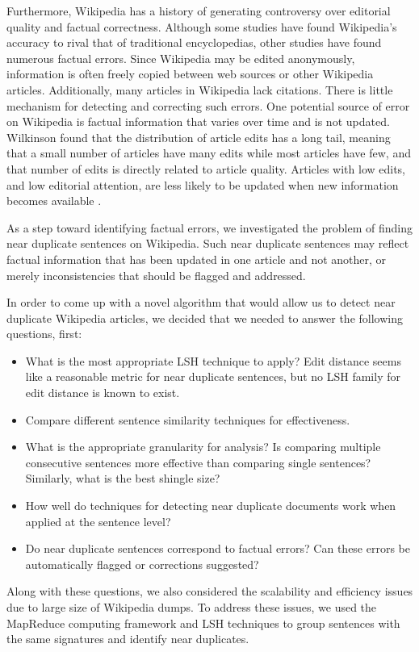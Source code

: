 \documentclass{acm_proc_article-sp}
\begin{document}
Furthermore, Wikipedia has a history of generating controversy over editorial quality and factual correctness. Although some studies have found Wikipedia’s accuracy to rival that of traditional encyclopedias, other studies have found numerous factual errors. Since Wikipedia may be edited anonymously, information is often freely copied between web sources or other Wikipedia articles. Additionally, many articles in Wikipedia lack citations. There is little mechanism for detecting and correcting such errors. One potential source of error on Wikipedia is factual information that varies over time and is not updated. Wilkinson found that the distribution of article edits has a long tail, meaning that a small number of articles have many edits while most articles have few, and that number of edits is directly related to article quality. Articles with low edits, and low editorial attention, are less likely to be updated when new information becomes available \cite{wilkinson:wiki}.

As a step toward identifying factual errors, we investigated the problem of finding near duplicate sentences on Wikipedia. Such near duplicate sentences may reflect factual information that has been updated in one article and not another, or merely inconsistencies that should be flagged and addressed. 

In order to come up with a novel algorithm that would allow us to detect near duplicate Wikipedia articles, we decided that we needed to answer the following questions, first:
\begin{itemize}
\item What is the most appropriate LSH technique to apply? Edit distance seems like a reasonable metric for near duplicate sentences, but no LSH family for edit distance is known to exist.
\item Compare different sentence similarity techniques for effectiveness. 
\item What is the appropriate granularity for analysis? Is comparing multiple consecutive sentences more effective than comparing single sentences? Similarly, what is the best shingle size?
\item How well do techniques for detecting near duplicate documents work when applied at the sentence level?
\item Do near duplicate sentences correspond to factual errors? Can these errors be automatically flagged or corrections suggested?
\end{itemize}

Along with these questions, we also considered the scalability and efficiency issues due to large size of Wikipedia dumps. To address these issues, we used the MapReduce computing framework and LSH techniques to group sentences with the same signatures and identify near duplicates.
\end{document}
